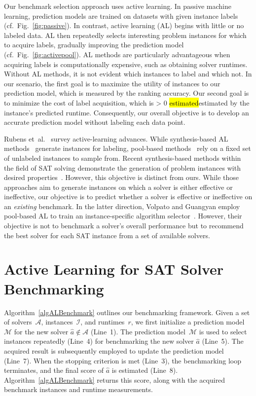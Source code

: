 \documentclass[sn-basic, Numbered]{sn-jnl} %
\newcommand{\showchanges}{1} %
\newcommand{\change}[1]{\ifnum \showchanges > 0 \sethlcolor{yellow}\hl{#1}\else#1\fi}
\begin{document}
Our benchmark selection approach uses active learning.
In passive machine learning, prediction models are trained on datasets with given instance labels (cf.~Fig.~\ref{fig:passive}).
In contrast, active learning (AL) begins with little or no labeled data.
AL then repeatedly selects interesting problem instances for which to acquire labels, gradually improving the prediction model (cf.~Fig.~\ref{fig:activepool}).
AL methods are particularly advantageous when acquiring labels is computationally expensive, such as obtaining solver runtimes.
Without AL methods, it is not evident which instances to label and which not.
In our scenario, the first goal is to maximize the utility of instances to our prediction model, which is measured by the ranking accuracy.
Our second goal is to minimize the cost of label acquisition, which is \change{estimated} by the instance's predicted runtime.
Consequently, our overall objective is to develop an accurate prediction model without labeling each data point.

Rubens et~al.~\cite{RubensESK15} survey active-learning advances.
While synthesis-based AL methods~\cite{0001AEMN22,GarzonMG22,2019gaal} generate instances for labeling, pool-based methods~\cite{GolbandiKL11,HarpaleY08,KorenBV09} rely on a fixed set of unlabeled instances to sample from.
Recent synthesis-based methods within the field of SAT solving demonstrate the generation of problem instances with desired properties~\cite{0001AEMN22,GarzonMG22}.
However, this objective is distinct from ours.
While those approaches aim to generate instances on which a solver is either effective or ineffective, our objective is to predict whether a solver is effective or ineffective on an \emph{existing} benchmark.
In the latter direction, Volpato and Guangyan employ pool-based AL to train an instance-specific algorithm selector~\cite{volpato2019active}.
However, their objective is not to benchmark a solver's overall performance but to recommend the best solver for each SAT instance from a set of available solvers.


\section{Active Learning for SAT Solver Benchmarking}
\label{sec:main}

Algorithm~\ref{algALBenchmark} outlines our benchmarking framework. 
Given a set of solvers~$\mathcal{A}$, instances~$\mathcal{I}$, and runtimes~$r$, we first initialize a prediction model~$\mathcal{M}$ for the new solver $\hat a \not\in \mathcal{A}$ (Line~1).
The prediction model~$\mathcal{M}$ is used to select instances repeatedly (Line~4) for benchmarking the new solver $\hat a$ (Line~5). 
The acquired result is subsequently employed to update the prediction model (Line~7). 
When the stopping criterion is met (Line~3), the benchmarking loop terminates, and the final score of $\hat{a}$ is estimated (Line~8). 
Algorithm~\ref{algALBenchmark} returns this score, along with the acquired benchmark instances and runtime measurements. 
\end{document}
